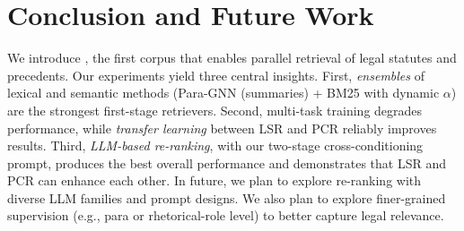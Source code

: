 \section{Conclusion and Future Work} \label{sec:future}
We introduce \ilpcsr{}, the first corpus that enables parallel retrieval of legal statutes and precedents. Our experiments yield three central insights. First, \textit{ensembles} of lexical and semantic methods (Para-GNN (summaries) + BM25 with dynamic $\alpha$) are the strongest first-stage retrievers. Second, multi-task training degrades performance, while \textit{transfer learning} between LSR and PCR reliably improves results. Third, \textit{LLM-based re-ranking}, with our two-stage cross-conditioning prompt, produces the best overall performance and demonstrates that LSR and PCR can enhance each other. In future, we plan to explore re-ranking with diverse LLM families and prompt designs. 
We also plan to explore finer-grained supervision (e.g., para or rhetorical-role level) to better capture legal relevance. 

